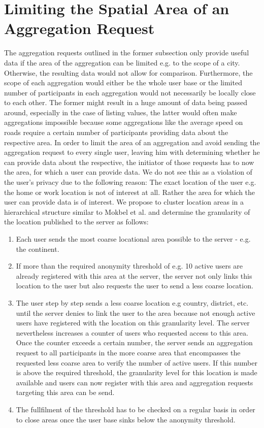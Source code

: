  \section{Limiting the Spatial Area of an Aggregation Request}
 The aggregation requests outlined in the former subsection only provide useful data if the area of the aggregation can be limited e.g. to the scope of a city. Otherwise, the resulting data would not allow for comparison. Furthermore, the scope of each aggregation would either be the whole user base or the limited number of participants in each aggregation would not necessarily be locally close to each other. The former might result in a huge amount of data being passed around, especially in the case of listing values, the latter would often make aggregations impossible because some aggregations like the average speed on roads require a certain number of participants providing data about the respective area. 
 In order to limit the area of an aggregation and avoid sending the aggregation request to every single user, leaving him with determining whether he can provide data about the respective, the initiator of those requests has to now the area, for which a user can provide data.
 We do not see this as a violation of the user's privacy due to the following reason: The exact location of the user e.g. the home or work location is not of interest at all. Rather the area for which the user can provide data is of interest. We propose to cluster location areas in a hierarchical structure similar to Mokbel et al. \parencite{casper} and determine the granularity of the location published to the server as follows:
\begin{enumerate}
	\item Each user sends the most coarse locational area possible to the server - e.g. the continent.
	\item If more than the required anonymity threshold of e.g. 10 active users are already registered with this area at the server, the server not only links this location to the user but also requests the user to send a less coarse location.
	\item The user step by step sends a less coarse location e.g country, district, etc. until the server denies to link the user to the area because not enough active users have registered with the location on this granularity level. The server nevertheless increases a counter of users who requested access to this area. Once the counter exceeds a certain number, the server sends an aggregation request to all participants in the more coarse area that encompasses the requested less coarse area to verify the number of active users. If this number is above the required threshold, the granularity level for this location is made available and users can now register with this area and aggregation requests targeting this area can be send.
	\item The fullfilment of the threshold has to be checked on a regular basis in order to close areas once the user base sinks below the anonymity threshold.
\end{enumerate}
